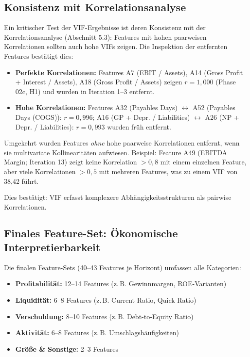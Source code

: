 \subsection{Konsistenz mit Korrelationsanalyse}

Ein kritischer Test der VIF-Ergebnisse ist deren Konsistenz mit der Korrelationsanalyse (Abschnitt 5.3): Features mit hohen paarweisen Korrelationen sollten auch hohe VIFs zeigen. Die Inspektion der entfernten Features bestätigt dies:

\begin{itemize}[topsep=0.2\baselineskip]
    \item \textbf{Perfekte Korrelationen:} Features A7 (EBIT / Assets), A14 (Gross Profit + Interest / Assets), A18 (Gross Profit / Assets) zeigen $r = 1{,}000$ (Phase 02c, H1) und wurden in Iteration 1–3 entfernt.
    \item \textbf{Hohe Korrelationen:} Features A32 (Payables Days) $\leftrightarrow$ A52 (Payables Days (COGS)): $r = 0{,}996$; A16 (GP + Depr. / Liabilities) $\leftrightarrow$ A26 (NP + Depr. / Liabilities): $r = 0{,}993$ wurden früh entfernt.
\end{itemize}

Umgekehrt wurden Features \textit{ohne} hohe paarweise Korrelationen entfernt, wenn sie multivariate Kollinearitäten aufwiesen. Beispiel: Feature A49 (EBITDA Margin; Iteration 13) zeigt keine Korrelation $> 0{,}8$ mit einem einzelnen Feature, aber viele Korrelationen $> 0{,}5$ mit mehreren Features, was zu einem VIF von 38{,}42 führt.

Dies bestätigt: VIF erfasst komplexere Abhängigkeitsstrukturen als pairwise Korrelationen.

\subsection{Finales Feature-Set: Ökonomische Interpretierbarkeit}

Die finalen Feature-Sets (40–43 Features je Horizont) umfassen alle Kategorien:

\begin{itemize}[topsep=0.2\baselineskip]
    \item \textbf{Profitabilität:} 12–14 Features (z.\,B. Gewinnmargen, ROE-Varianten)
    \item \textbf{Liquidität:} 6–8 Features (z.\,B. Current Ratio, Quick Ratio)
    \item \textbf{Verschuldung:} 8–10 Features (z.\,B. Debt-to-Equity Ratio)
    \item \textbf{Aktivität:} 6–8 Features (z.\,B. Umschlagshäufigkeiten)
    \item \textbf{Größe \& Sonstige:} 2–3 Features
\end{itemize}

